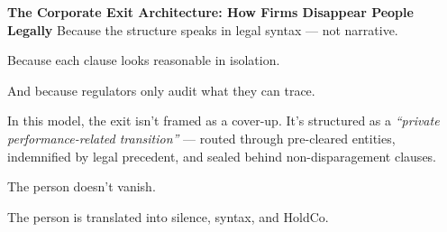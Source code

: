\begin{HistoricalSidebar}{\textbf{The Corporate Exit Architecture: How Firms Disappear People Legally}}
    Because the structure speaks in legal syntax — not narrative.

    \medskip
    
    Because each clause looks reasonable in isolation.

    \medskip
    
    And because regulators only audit what they can trace.
    
    \medskip
    
    In this model, the exit isn’t framed as a cover-up. It’s structured as a \textit{“private 
    performance-related transition”} — routed through pre-cleared entities, indemnified by legal 
    precedent, and sealed behind non-disparagement clauses.

    \medskip
    
    The person doesn’t vanish.

    \medskip
    
    The person is translated into silence, syntax, and HoldCo.
    
\end{HistoricalSidebar}
